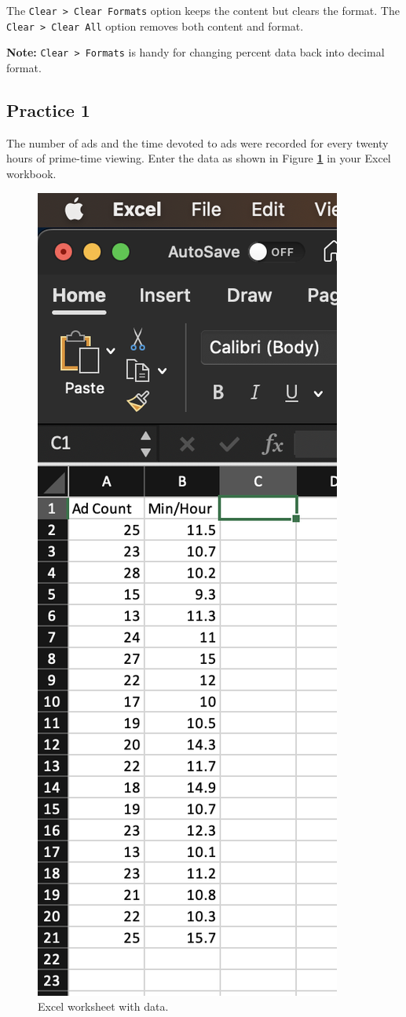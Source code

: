 \documentclass[
]{book}
\begin{document}
The \texttt{Clear\ \textgreater{}\ Clear\ Formats} option keeps the content but clears the format. The \texttt{Clear\ \textgreater{}\ Clear\ All} option removes both content and format.

\textbf{Note:} \texttt{Clear\ \textgreater{}\ Formats} is handy for changing percent data back into decimal format.

\hypertarget{practice-1}{%
\subsection{Practice 1}\label{practice-1}}

The number of ads and the time devoted to ads were recorded for every twenty hours of prime-time viewing. Enter the data as shown in Figure \textbf{\ref{fig:entering-data}} in your Excel workbook.

\begin{figure}

{\centering \includegraphics[width=0.45\linewidth]{entering_data} 

}

\caption{Excel worksheet with data.}\label{fig:entering-data}
\end{figure}
\end{document}
